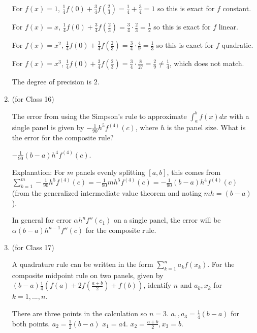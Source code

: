 \documentclass[12pt,letterpaper,answers]{exam}
\begin{document}
\begin{enumerate}
\begin{solution}
For $f(x) = 1$, $\frac{1}{4}f(0) + \frac{3}{4}f\left(\frac{2}{3}\right)=\frac{1}{4}+\frac{3}{4}=1$ so this is exact for $f$ constant.

For $f(x) = x$, $\frac{1}{4}f(0) + \frac{3}{4}f\left(\frac{2}{3}\right)= \frac{3}{4}\cdot\frac{2}{3}=\frac{1}{2}$ so this is exact for $f$ linear.

For $f(x) = x^2$, $\frac{1}{4}f(0) + \frac{3}{4}f\left(\frac{2}{3}\right)= \frac{3}{4}\cdot\frac{4}{9}=\frac{1}{3}$ so this is exact for $f$ quadratic.

For $f(x) = x^3$, $\frac{1}{4}f(0) + \frac{3}{4}f\left(\frac{2}{3}\right)= \frac{3}{4}\cdot\frac{8}{27}=\frac{2}{9}\neq\frac{1}{4}$, which does not match.

The degree of precision is $2$.
\end{solution}


\item (for Class 16)

The error from using the Simpson's rule to approximate $\int_a^b f(x)dx$ with a single panel is given by $-\frac{1}{90}h^5f^{(4)}(c)$, where $h$ is the panel size.  What is the error for the composite rule?

\begin{solution}
$-\frac{1}{90}(b-a)h^4f^{(4)}(c)$.  

Explanation:
For $m$ panels evenly splitting $[a,b]$, this comes from $\sum\limits_{k=1}^m -\frac{1}{90}h^5f^{(4)}(c) = -\frac{1}{90}mh^5f^{(4)}(c) = -\frac{1}{90}(b-a)h^4f^{(4)}(c)$ (from the generalized intermediate value theorem and noting $mh = (b-a)$).

In general for error $\alpha h^nf''(c_1)$ on a single panel, the error will be $\alpha (b-a)h^{n-1}f''(c)$ for the composite rule.
\end{solution}

\item (for Class 17)

A quadrature rule can be written in the form $\sum\limits_{k=1}^n a_k f(x_k)$. For the composite midpoint rule on two panels, given by $( b-a)\frac{1}{4}\left(f(a)+2f(\frac{a+b}{2})+f(b)\right)$, identify $n$ and $a_k, x_k$ for $k=1,...,n$.


\begin{solution}
There are three points in the calculation so $n = 3$.
$a_1, a_3 = \frac{1}{4}(b-a)$ for both points. $a_2= \frac{1}{2}(b-a)$ $x_1 = a4$. $x_2 = \frac{a+b}{2}, x_3=b$.
\end{solution}


\end{enumerate}
\end{document}
